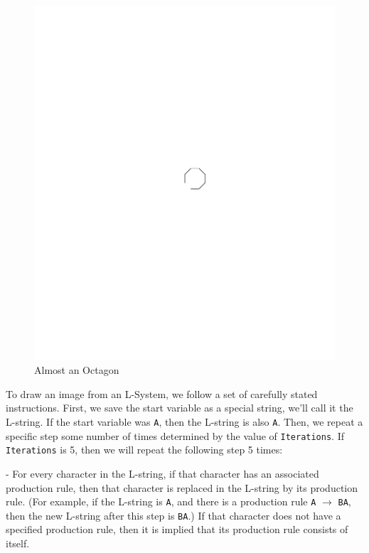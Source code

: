 \documentclass[12pt,twoside]{reedthesis}
\newcommand{\code}[1]{\texttt{#1}}
\begin{document}
	\begin{figure}[h!]
	\centering
	\includegraphics[clip=true, viewport=4in 5.68in 7in 6.37in, scale=1]{Images/UnderstandingThroughDefinitions1}
	\caption[Almost an Octagon]{Almost an Octagon\footnotemark}
	\label {Octagon}
	\end{figure}
	
	To draw an image from an L-System, we follow a set of carefully stated instructions. First, we save the start variable as a special string, we'll call it the L-string. If the start variable was \code{A}, then the L-string is also \code{A}. Then, we repeat a specific step some number of times determined by the value of \code{Iterations}. If \code{Iterations} is 5, then we will repeat the following step 5 times:\\
	
	\begin{addmargin}[4em]{4em}
	- For every character in the L-string, if that character has an associated production rule, then that character is replaced in the L-string by its production rule. (For example, if the L-string is \code{A}, and there is a production rule \code{A} $\rightarrow$ \code{BA}, then the new L-string after this step is \code{BA}.) If that character does not have a specified production rule, then it is implied that its production rule consists of itself.\\
	 \end{addmargin}
	 
\end{document}
